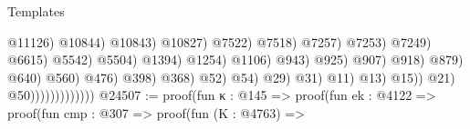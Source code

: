 \begin{lexlean}{Templates}
\begin{coremodule}
                                                                                                    @11126)
                                                                                                  @10844)
                                                                                                @10843)
                                                                                              @10827)
                                                                                            @7522)
                                                                                          @7518)
                                                                                        @7257)
                                                                                      @7253)
                                                                                    @7249)
                                                                                  @6615)
                                                                                @5542)
                                                                              @5504)
                                                                            @1394)
                                                                          @1254)
                                                                        @1106)
                                                                      @943)
                                                                    @925)
                                                                  @907)
                                                                @918)
                                                              @879)
                                                            @640)
                                                          @560)
                                                        @476)
                                                      @398)
                                                    @368)
                                                  @52)
                                                @54)
                                              @29)
                                            @31)
                                          @11)
                                        @13)
                                      @15))
                                @21)
                              @50)))))))))))))
@24507 := proof(fun {κ : @145} =>
    proof(fun {ek : @4122} =>
      proof(fun {cmp : @307} =>
        proof(fun (K : @4763) =>

\end{coremodule}
\end{lexlean}
